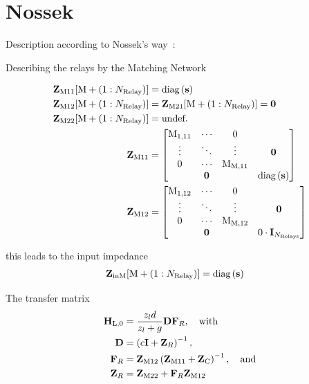 \chapter{Nossek}
\label{sec:nossek}


Description according to Nossek's way~\cite{Nossek}:

Describing the relays by the Matching Network

\begin{align}
\label{eq:nossek_matching}
\mathbf{Z}_\text{M11}[\text{M}+\left(1:N_\text{Relay}\right)] &= \text{diag}\left(\mathbf{s}\right)\\
\mathbf{Z}_\text{M12}[\text{M}+\left(1:N_\text{Relay}\right)] &= 
	\mathbf{Z}_\text{M21}[\text{M}+\left(1:N_\text{Relay}\right)] = \mathbf{0}\\
\mathbf{Z}_\text{M22}[\text{M}+\left(1:N_\text{Relay}\right)] &= \text{undef.}\\
\mathbf{Z}_\text{M11} &=
\begin{bmatrix}
\text{M}_\text{1,11} & \cdots & 0 &\\
 \vdots & \ddots & \vdots & \mathbf{0} \\
 0 & \cdots & \text{M}_\text{M,11}&\\
 & \mathbf{0}& & \text{diag}\left(\mathbf{s}\right)
\end{bmatrix}\\
\mathbf{Z}_\text{M12}&=
\begin{bmatrix}
\text{M}_\text{1,12} & \cdots& 0&\\
\vdots & \ddots & \vdots & \mathbf{0}\\
0 & \cdots & \text{M}_\text{M,12}&\\
& \mathbf{0} &	& 0\cdot\mathbf{I}_{N_\text{Relays}}
\end{bmatrix}
\end{align}

this leads to the input impedance
\begin{align}
\label{eq:nossek_matching}
\mathbf{Z}_\text{inM}[\text{M}+\left(1:N_\text{Relay}\right)] &= \text{diag}\left(\mathbf{s}\right)
\end{align}



The transfer matrix
\begin{align}
\label{eq:nossek_transf}
\mathbf{H}_\text{L,0} &= \frac{z_l d}{z_l + g}\mathbf{D}\mathbf{F}_R,\quad\text{with}\\
\mathbf{D} &= \left(c\mathbf{I} + \mathbf{Z}_R\right)^{-1},\\
\mathbf{F}_R &= \mathbf{Z}_\text{M12}\left(\mathbf{Z}_\text{M11}+\mathbf{Z}_\text{C}\right)^{-1},\quad\text{and}\\
\mathbf{Z}_R &= \mathbf{Z}_\text{M22} + \mathbf{F}_R\mathbf{Z}_\text{M12}
\end{align}

